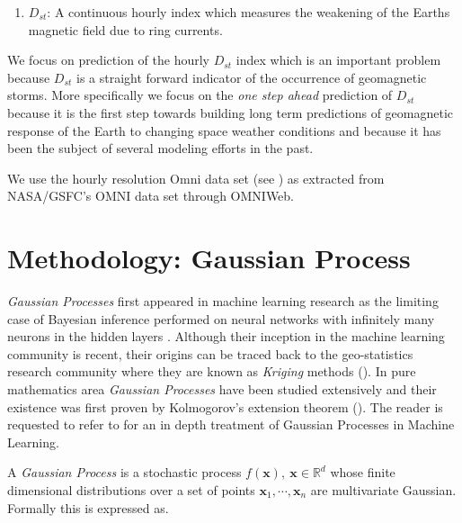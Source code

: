\documentclass[referee,a4paper,12pt,traditabstract]{swsc}
\begin{document}
\begin{linenumbers}
\begin{enumerate}
    \item $D_{st}$: A continuous hourly index which measures the weakening of the Earths magnetic field due to ring currents. 
\end{enumerate}

We focus on prediction of the hourly $D_{st}$ index which is an important problem because $D_{st}$ is a straight forward indicator of the occurrence of geomagnetic storms. More specifically we focus on the \emph{one step ahead} prediction of $D_{st}$ because it is the first step towards building long term predictions of geomagnetic response of the Earth to changing space weather conditions and because it has been the subject of several modeling efforts in the past.  


We use the hourly resolution Omni data set (see \cite{OmniPaper}) as extracted from NASA/GSFC's OMNI data set through OMNIWeb.
   
  
\section{Methodology: Gaussian Process}

\emph{Gaussian Processes} first appeared in machine learning research as the limiting case of Bayesian inference performed on neural networks with infinitely many neurons in the hidden layers \citet{Neal:1996:BLN:525544}. Although their inception in the machine learning community is recent, their origins can be traced back to the geo-statistics research community where they are known as \emph{Kriging} methods (\citet{krige1951statistical}). In pure mathematics area \emph{Gaussian Processes} have been studied extensively and their existence was first proven by Kolmogorov's extension theorem (\citet{tao2011introduction}). The reader is requested to refer to \cite{Rasmussen:2005:GPM:1162254} for an in depth treatment of Gaussian Processes in Machine Learning.


A \emph{Gaussian Process} is a stochastic process $f(\mathbf{x}), \ \mathbf{x} \in \mathbb{R}^d$ whose finite dimensional distributions over a set of points $\mathbf{x}_1, \cdots, \mathbf{x}_n$ are multivariate Gaussian. Formally this is expressed as.


\end{linenumbers}
\end{document}
